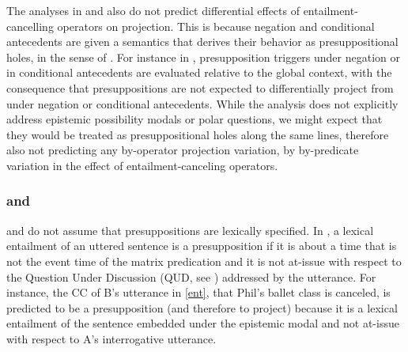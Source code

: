 \documentclass[a4paper,12pt,twoside]{article}
\begin{document}
		The analyses in \citealt{heim_projection_1983} and \citealt{van_der_sandt_presupposition_1992} also do not predict differential effects of entailment-cancelling operators on projection. This is because negation and conditional antecedents are given a semantics that derives their behavior as presuppositional holes, in the sense of \citealt{karttunen_observations_1971}. For instance in \citealt{heim_projection_1983}, presupposition triggers under negation or in conditional antecedents are evaluated relative to the global context, with the consequence that presuppositions are not expected to differentially project from under negation or conditional antecedents. %
  While the analysis does not explicitly address epistemic possibility modals or polar questions, we might expect that they would be treated as presuppositional holes along the same lines, therefore also not predicting any by-operator projection variation, by by-predicate variation in the effect of entailment-canceling operators.
		
	

	\subsubsection{\citealt{abrusan_predicting_2011} and \citealt*{simons_best_2017}}\label{s:abrusan}

\citealt{abrusan_predicting_2011} and \citealt{simons_best_2017} do not assume that presuppositions are lexically specified. In \citealt{abrusan_predicting_2011}, a lexical entailment of an uttered sentence is a presupposition if it is about a time that is not the event time of the matrix predication and it is not at-issue with respect to the Question Under Discussion (QUD, see \citealt{roberts_information_1996,roberts_information_2012}) addressed by the utterance. For instance, the CC of B's utterance in \ref{ent}, that Phil's ballet class is canceled, is predicted to be a presupposition (and therefore to project) because it is a lexical entailment of the sentence embedded under the epistemic modal and not at-issue with respect to A's interrogative utterance. 
\end{document}
